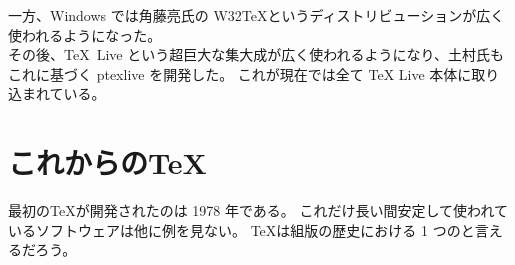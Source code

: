 一方、Windows では角藤亮{\small 氏}の W32\TeX{}というディストリビューションが広く使われるようになった。\\

その後、\TeX{}~Live という超巨大な集大成が広く使われるようになり、土村{\small 氏}もこれに基づく ptexlive を開発した。
これが現在では全て \TeX{} Live 本体に取り込まれている。
\section{これからの\TeX{}}
最初の\TeX{}が開発されたのは 1978 年である。
これだけ長い間安定して使われているソフトウェアは他に例を見ない。
\TeX{}は組版の歴史における 1 つのと言えるだろう。\\

